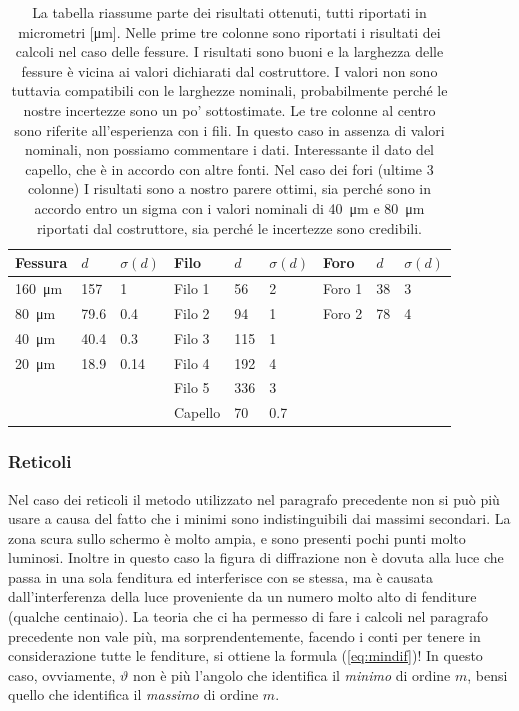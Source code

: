 \begin{table}[t!]
    \centering
    \begin{tabular}{l | l l || l | l l || l | l l}
        \toprule
        Fessura & $d$ & $\sigma(d)$ & Filo & $d$ & $\sigma(d)$ & Foro & $d$ & $\sigma(d)$ \\
        \midrule
        \SI{160}{\micro\metre} & 157  & 1    & Filo 1  & 56    &   2   & Foro 1 & 38 & 3 \\
        \SI{80}{\micro\metre}  & 79.6 & 0.4  & Filo 2  & 94    &   1   & Foro 2 & 78 & 4 \\
        \SI{40}{\micro\metre}  & 40.4 & 0.3  & Filo 3  & 115   &   1   &        &    &   \\
        \SI{20}{\micro\metre}  & 18.9 & 0.14 & Filo 4  & 192   &   4   &        &    &   \\
                               &      &      & Filo 5  & 336   &   3   &        &    &   \\
                               &      &      & Capello & 70    &   0.7 &        &    &   \\
        \bottomrule
    \end{tabular}
    \caption{La tabella riassume parte dei risultati ottenuti, tutti riportati in micrometri [\si{\micro\metre}].
    Nelle prime tre colonne sono riportati i risultati dei calcoli
    nel caso delle fessure. I risultati sono buoni e la larghezza delle fessure è vicina ai valori dichiarati dal costruttore.
    I valori non sono tuttavia compatibili con le larghezze nominali, probabilmente perché le nostre incertezze sono un po' sottostimate.
    Le tre colonne al centro sono riferite all'esperienza con i fili. In questo caso in assenza di valori nominali, non possiamo
    commentare i dati. Interessante il dato del capello, che è in accordo con altre fonti. Nel caso dei fori (ultime 3 colonne)
    I risultati sono a nostro parere ottimi, sia perché sono in accordo entro un sigma con i valori nominali di \SI{40}{\micro\metre} e
    \SI{80}{\micro\metre} riportati dal costruttore, sia perché le incertezze sono credibili.}
    \label{tab:ost}
\end{table}

\subsubsection{Reticoli}

Nel caso dei reticoli il metodo utilizzato nel paragrafo precedente non si può più usare a causa del fatto che i minimi sono
indistinguibili dai massimi secondari. La zona scura sullo schermo è molto ampia, e sono presenti pochi punti molto luminosi.
Inoltre in questo caso la figura di diffrazione non è dovuta alla luce che passa in una sola fenditura ed interferisce con se stessa,
ma è causata dall'interferenza della luce proveniente da un numero molto alto di fenditure (qualche centinaio).
La teoria che ci ha permesso di fare i calcoli nel paragrafo precedente non vale più, ma sorprendentemente, facendo i conti per
tenere in considerazione tutte le fenditure, si ottiene la formula (\ref{eq:mindif})! In questo caso, ovviamente, $\vartheta$
non è più l'angolo che identifica il \emph{minimo} di ordine $m$, bensi quello che identifica il \emph{massimo} di ordine $m$.


